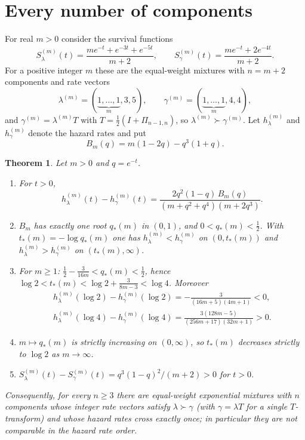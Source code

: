 \documentclass[10pt]{article}
\theoremstyle{plain}
\newtheorem{theorem}{Theorem}[section]
\theoremstyle{definition}
\theoremstyle{remark}
\begin{document}
\section{Every number of components}\label{sec:padded}

For real $m>0$ consider the survival functions
\begin{equation}\label{eq:padded}
S^{(m)}_\lambda(t)=\frac{m e^{-t}+e^{-3t}+e^{-5t}}{m+2},\qquad
S^{(m)}_\gamma(t)=\frac{m e^{-t}+2e^{-4t}}{m+2}.
\end{equation}
For a positive integer $m$ these are the equal-weight mixtures with $n=m+2$ components and rate vectors
\[
\lambda^{(m)}=(\underbrace{1,\dots,1}_{m},3,5),\qquad \gamma^{(m)}=(\underbrace{1,\dots,1}_{m},4,4),
\]
and $\gamma^{(m)}=\lambda^{(m)}T$ with $T=\tfrac12(I+\Pi_{n-1,n})$, so $\lambda^{(m)}\succ\gamma^{(m)}$. Let $h^{(m)}_\lambda$ and $h^{(m)}_\gamma$ denote the hazard rates and put
\begin{equation}\label{eq:Bm}
B_m(q)=m(1-2q)-q^3(1+q).
\end{equation}

\begin{theorem}\label{thm:padded}
Let $m>0$ and $q=e^{-t}$.
\begin{enumerate}
\item[(a)] For $t>0$,
\begin{equation}\label{eq:paddeddiff}
h^{(m)}_\lambda(t)-h^{(m)}_\gamma(t)=\frac{2q^2(1-q)\,B_m(q)}{(m+q^2+q^4)(m+2q^3)} .
\end{equation}
\item[(b)] $B_m$ has exactly one root $q_*(m)$ in $(0,1)$, and $0<q_*(m)<\tfrac12$. With $t_*(m)=-\log q_*(m)$ one has $h^{(m)}_\lambda<h^{(m)}_\gamma$ on $(0,t_*(m))$ and $h^{(m)}_\lambda>h^{(m)}_\gamma$ on $(t_*(m),\infty)$.
\item[(c)] For $m\ge 1$: $\tfrac12-\tfrac{3}{16m}<q_*(m)<\tfrac12$, hence $\log 2<t_*(m)<\log 2+\tfrac{3}{8m-3}<\log 4$. Moreover
\begin{gather*}
h^{(m)}_\lambda(\log 2)-h^{(m)}_\gamma(\log 2)=-\frac{3}{(16m+5)(4m+1)}<0,\\
h^{(m)}_\lambda(\log 4)-h^{(m)}_\gamma(\log 4)=\frac{3(128m-5)}{(256m+17)(32m+1)}>0 .
\end{gather*}
\item[(d)] $m\mapsto q_*(m)$ is strictly increasing on $(0,\infty)$, so $t_*(m)$ decreases strictly to $\log 2$ as $m\to\infty$.
\item[(e)] $S^{(m)}_\lambda(t)-S^{(m)}_\gamma(t)=q^3(1-q)^2/(m+2)>0$ for $t>0$.
\end{enumerate}
Consequently, for every $n\ge 3$ there are equal-weight exponential mixtures with $n$ components whose integer rate vectors satisfy $\lambda\succ\gamma$ (with $\gamma=\lambda T$ for a single $T$-transform) and whose hazard rates cross exactly once; in particular they are not comparable in the hazard rate order.
\end{theorem}
\end{document}
